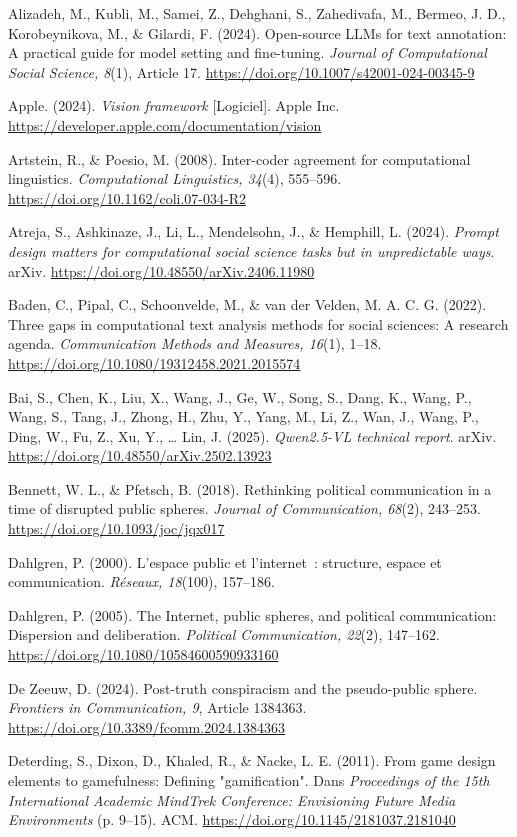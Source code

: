 \documentclass[11pt,a4paper]{article}
\begin{document}
Alizadeh, M., Kubli, M., Samei, Z., Dehghani, S., Zahedivafa, M., Bermeo, J. D., Korobeynikova, M., \& Gilardi, F. (2024). Open-source LLMs for text annotation: A practical guide for model setting and fine-tuning. \emph{Journal of Computational Social Science, 8}(1), Article 17. \url{https://doi.org/10.1007/s42001-024-00345-9}

Apple. (2024). \emph{Vision framework} [Logiciel]. Apple Inc. \url{https://developer.apple.com/documentation/vision}

Artstein, R., \& Poesio, M. (2008). Inter-coder agreement for computational linguistics. \emph{Computational Linguistics, 34}(4), 555--596. \url{https://doi.org/10.1162/coli.07-034-R2}

Atreja, S., Ashkinaze, J., Li, L., Mendelsohn, J., \& Hemphill, L. (2024). \emph{Prompt design matters for computational social science tasks but in unpredictable ways}. arXiv. \url{https://doi.org/10.48550/arXiv.2406.11980}

Baden, C., Pipal, C., Schoonvelde, M., \& van der Velden, M. A. C. G. (2022). Three gaps in computational text analysis methods for social sciences: A research agenda. \emph{Communication Methods and Measures, 16}(1), 1--18. \url{https://doi.org/10.1080/19312458.2021.2015574}

Bai, S., Chen, K., Liu, X., Wang, J., Ge, W., Song, S., Dang, K., Wang, P., Wang, S., Tang, J., Zhong, H., Zhu, Y., Yang, M., Li, Z., Wan, J., Wang, P., Ding, W., Fu, Z., Xu, Y., … Lin, J. (2025). \emph{Qwen2.5-VL technical report}. arXiv. \url{https://doi.org/10.48550/arXiv.2502.13923}

Bennett, W. L., \& Pfetsch, B. (2018). Rethinking political communication in a time of disrupted public spheres. \emph{Journal of Communication, 68}(2), 243--253. \url{https://doi.org/10.1093/joc/jqx017}

Dahlgren, P. (2000). L'espace public et l'internet~: structure, espace et communication. \emph{Réseaux, 18}(100), 157--186.

Dahlgren, P. (2005). The Internet, public spheres, and political communication: Dispersion and deliberation. \emph{Political Communication, 22}(2), 147--162. \url{https://doi.org/10.1080/10584600590933160}

De Zeeuw, D. (2024). Post-truth conspiracism and the pseudo-public sphere. \emph{Frontiers in Communication, 9}, Article 1384363. \url{https://doi.org/10.3389/fcomm.2024.1384363}

Deterding, S., Dixon, D., Khaled, R., \& Nacke, L. E. (2011). From game design elements to gamefulness: Defining "gamification". Dans \emph{Proceedings of the 15th International Academic MindTrek Conference: Envisioning Future Media Environments} (p. 9--15). ACM. \url{https://doi.org/10.1145/2181037.2181040}
\end{document}
